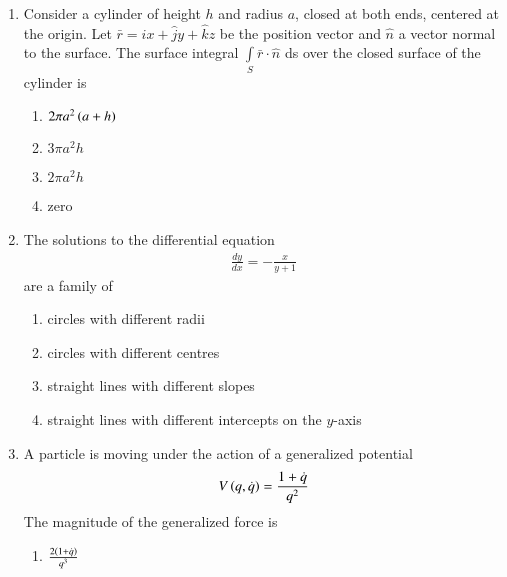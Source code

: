 \documentclass[journal]{IEEEtran}
\begin{document}
\begin{enumerate}
\item Consider a cylinder of height $h$ and radius $a$, closed at both ends, centered at the origin. Let $\bar r=\hat{i}x+\hat{j}y+\hat{k}z$ be the position vector and $\hat{n}$ a vector normal to the surface. The surface integral $\displaystyle \int\limits_{S} \bar r\cdot \hat{n}$ ds
over the closed surface of the cylinder is
\begin{multicols}{2}
\begin{enumerate}
    \item $2\pi a^2\left(a+h\right)$
    \item $3\pi a^2h$
    \item $2\pi a^2h$
    \item zero
\end{enumerate}
\end{multicols}
\item The solutions to the differential equation 
\begin{align*}
\frac{dy}{dx}=-\frac{x}{y+1}
\end{align*}
 are a family of
\begin{enumerate}
    \item circles with different radii
    \item circles with different centres
    \item straight lines with different slopes
    \item straight lines with different intercepts on the $y$-axis
\end{enumerate}
\item A particle is moving under the action of a generalized potential
\begin{align*}
    V\left(q,\dot{q}\right)=\frac{1+\dot{q}}{q^2}
\end{align*}
The magnitude of the generalized force is
\begin{multicols}{4}
    \begin{enumerate}
        \item $\frac{2\left(1+\dot{q}\right)}{q^3}$

\end{enumerate}
\end{multicols}
\end{enumerate}
\end{document}
